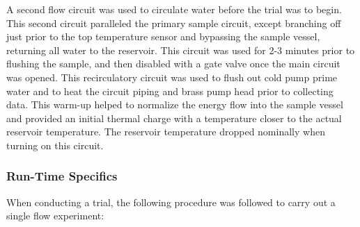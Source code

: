 A second flow circuit was used to circulate water before the trial was to begin. This second circuit paralleled the primary sample circuit, except branching off just prior to the top temperature sensor and bypassing the sample vessel, returning all water to the reservoir. This circuit was used for 2-3 minutes prior to flushing the sample, and then disabled with a gate valve once the main circuit was opened. This recirculatory circuit was used to flush out cold pump prime water and to heat the circuit piping and brass pump head prior to collecting data. This warm-up helped to normalize the energy flow into the sample vessel and provided an initial thermal charge with a temperature closer to the actual reservoir temperature. The reservoir temperature dropped nominally when turning on this circuit. 


\subsubsection*{Run-Time Specifics}

When conducting a trial, the following procedure was followed to carry out a single flow experiment:


